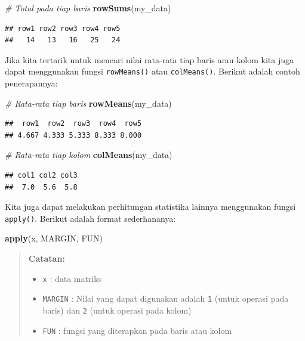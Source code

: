 \documentclass[]{book}
\newenvironment{Shaded}{\begin{snugshade}}{\end{snugshade}}
\newcommand{\CommentTok}[1]{\textcolor[rgb]{0.56,0.35,0.01}{\textit{#1}}}
\newcommand{\KeywordTok}[1]{\textcolor[rgb]{0.13,0.29,0.53}{\textbf{#1}}}
\newcommand{\NormalTok}[1]{#1}
\providecommand{\tightlist}{%
  \setlength{\itemsep}{0pt}\setlength{\parskip}{0pt}}
\theoremstyle{definition}
\theoremstyle{definition}
\theoremstyle{definition}
\theoremstyle{remark}
\begin{document}
\begin{Shaded}
\begin{Highlighting}[]
\CommentTok{# Total pada tiap baris}
\KeywordTok{rowSums}\NormalTok{(my_data)}
\end{Highlighting}
\end{Shaded}

\begin{verbatim}
## row1 row2 row3 row4 row5 
##   14   13   16   25   24
\end{verbatim}

Jika kita tertarik untuk mencari nilai rata-rata tiap baris arau kolom kita juga dapat menggunakan fungsi \texttt{rowMeans()} atau \texttt{colMeans()}. Berikut adalah contoh penerapannya:

\begin{Shaded}
\begin{Highlighting}[]
\CommentTok{# Rata-rata tiap baris}
\KeywordTok{rowMeans}\NormalTok{(my_data)}
\end{Highlighting}
\end{Shaded}

\begin{verbatim}
##  row1  row2  row3  row4  row5 
## 4.667 4.333 5.333 8.333 8.000
\end{verbatim}

\begin{Shaded}
\begin{Highlighting}[]
\CommentTok{# Rata-rata tiap kolom}
\KeywordTok{colMeans}\NormalTok{(my_data)}
\end{Highlighting}
\end{Shaded}

\begin{verbatim}
## col1 col2 col3 
##  7.0  5.6  5.8
\end{verbatim}

Kita juga dapat melakukan perhitungan statistika lainnya menggunakan fungsi \texttt{apply()}. Berikut adalah format sederhananya:

\begin{Shaded}
\begin{Highlighting}[]
\KeywordTok{apply}\NormalTok{(x, MARGIN, FUN)}
\end{Highlighting}
\end{Shaded}

\begin{quote}
\textbf{Catatan:}

\begin{itemize}
\tightlist
\item
  \texttt{x} : data matriks
\item
  \texttt{MARGIN} : Nilai yang dapat digunakan adalah \texttt{1} (untuk operasi pada baris) dan \texttt{2} (untuk operasi pada kolom)
\item
  \texttt{FUN} : fungsi yang diterapkan pada baris atau kolom
\end{itemize}
\end{quote}
\end{document}
